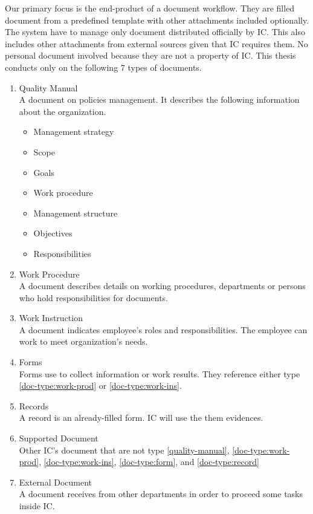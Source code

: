 Our primary focus is the end-product of a document workflow.
They are filled document from a predefined template with other attachments included optionally.
The system have to manage only document distributed officially by IC.
This also includes other attachments from external sources given that IC requires them.
No personal document involved because they are not a property of IC.
This thesis conducts only on the following 7 types of documents.
\begin{enumerate}
\item \label{quality-manual} Quality Manual \hfill \\
A document on policies management.
It describes the following information about the organization.
\begin{multicols}{2}
\begin{itemize}
\item Management strategy
\item Scope
\item Goals
\item Work procedure
\item Management structure
\item Objectives
\item Responsibilities
\end{itemize}
\end{multicols}

\item \label{doc-type:work-prod} Work Procedure \hfill \\
A document describes details on working procedures, departments or persons who hold responsibilities for documents.

\item \label{doc-type:work-ins} Work Instruction \hfill \\
A document indicates employee's roles and responsibilities.
The employee can work to meet organization's needs.

\item Forms \label{doc-type:form} \hfill \\
Forms use to collect information or work results.
They reference either type \ref{doc-type:work-prod} or \ref{doc-type:work-ins}.

\item Records \label{doc-type:record} \hfill \\
A record is an already-filled form.
IC will use the them evidences.

\item Supported Document \hfill \\
Other IC's document that are not type \ref{quality-manual}, \ref{doc-type:work-prod}, \ref{doc-type:work-ins}, \ref{doc-type:form}, and \ref{doc-type:record}

\item External Document \hfill \\
A document receives from other departments in order to proceed some tasks inside IC.
\end{enumerate}


